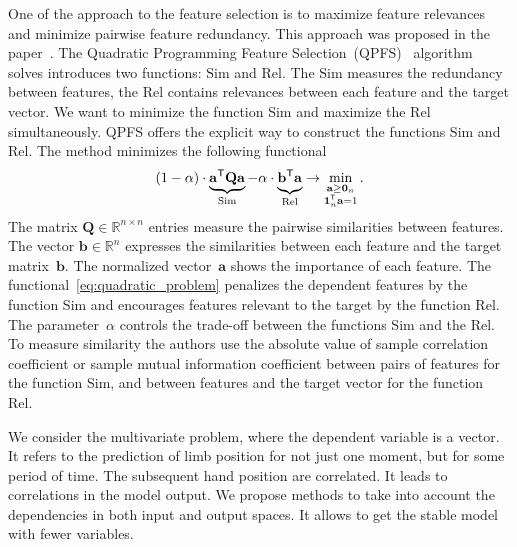 \documentclass[12pt,twoside]{article}
\theoremstyle{definition}
\newcommand{\ba}{\mathbf{a}}
\newcommand{\bb}{\mathbf{b}}
\newcommand{\bQ}{\mathbf{Q}}
\newcommand{\bbR}{\mathbb{R}}
\newcommand{\T}{\mathsf{T}}
\newcommand{\bOne}{\boldsymbol{1}}
\newcommand{\bZero}{\boldsymbol{0}}
\begin{document}
One of the approach to the feature selection is to maximize feature relevances and minimize pairwise feature redundancy. This approach was proposed in the paper~\cite{ding2005minimum}.
The Quadratic Programming Feature Selection~(QPFS)~\cite{rodriguez2010quadratic,katrutsa2017comprehensive} algorithm solves introduces two functions: $\text{Sim}$ and $\text{Rel}$.
The $\text{Sim}$ measures the redundancy between features, the $\text{Rel}$ contains relevances between each feature and the target vector.
We want to minimize the function Sim and maximize the Rel simultaneously.
QPFS offers the explicit way to construct the functions Sim and Rel.
The method minimizes the following functional
\begin{equation}
(1 - \alpha) \cdot \underbrace{\ba^{\T} \bQ \ba}_{\text{Sim}} - \alpha \cdot \underbrace{\vphantom{()} \bb^{\T} \ba}_{\text{Rel}} \rightarrow \min_{\substack{\ba \geq \bZero_n \\ \bOne_n^{\T} \ba=1}}.
\label{eq:quadratic_problem}
\end{equation}
The matrix $\bQ \in \bbR^{n \times n}$ entries measure the pairwise similarities between features.
The vector $\bb \in \bbR^n$ expresses the similarities between each feature and the target matrix~$\bb$.
The normalized vector~$\ba$ shows the importance of each feature.
The functional~\eqref{eq:quadratic_problem} penalizes the dependent features by the function Sim and encourages features relevant to the target by the function Rel.
The parameter~$\alpha$ controls the trade-off between the functions Sim and the Rel.
To measure similarity the authors use the absolute value of sample correlation coefficient or sample mutual information coefficient between pairs of features for the function Sim, and between features and the target vector for the function Rel.

We consider the multivariate problem, where the dependent variable is a vector. 
It refers to the prediction of limb position for not just one moment, but for some period of time. The subsequent hand position are correlated. 
It leads to correlations in the model output. 
We propose methods to take into account the dependencies in both input and output spaces. 
It allows to get the stable model with fewer variables.

\end{document}
